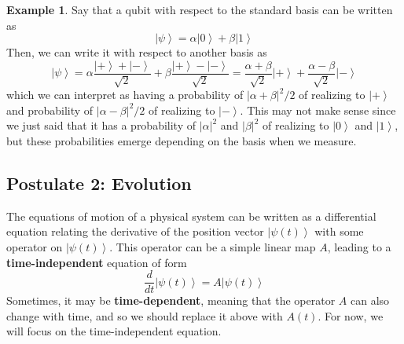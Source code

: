 \documentclass{article}
\newcommand{\ket}[1]{\ensuremath{\left|#1\right\rangle}}
\theoremstyle{definition}
\newtheorem{example}{Example}[section]
\begin{document}
    \begin{example} 
      Say that a qubit with respect to the standard basis can be written as 
      \begin{equation}
        \ket{\psi} = \alpha \ket{0} + \beta \ket{1}
        \label{eq:qubit_standard_basis}
      \end{equation}
      Then, we can write it with respect to another basis as 
      \begin{equation}
        \ket{\psi} = \alpha \frac{\ket{+} + \ket{-}}{\sqrt{2}} + \beta \frac{\ket{+} - \ket{-}}{\sqrt{2}} = \frac{\alpha + \beta}{\sqrt{2}} \ket{+} + \frac{\alpha - \beta}{\sqrt{2}} \ket{-}
        \label{eq:qubit_not_standard_basis}
      \end{equation}
      which we can interpret as having a probability of $|\alpha + \beta|^2 /2$ of realizing to $\ket{+}$ and probability of $|\alpha - \beta|^2 / 2$ of realizing to $\ket{-}$. This may not make sense since we just said that it has a probability of $|\alpha|^2$ and $|\beta|^2$ of realizing to $\ket{0}$ and $\ket{1}$, but these probabilities emerge depending on the basis when we measure.  
    \end{example}

  \subsection{Postulate 2: Evolution}

  The equations of motion of a physical system can be written as a differential equation relating the derivative of the position vector $\ket{\psi(t)}$ with some operator on $\ket{\psi(t)}$. This operator can be a simple linear map $A$, leading to a \textbf{time-independent} equation of form
    \begin{equation}
      \frac{d}{dt} \ket{\psi(t)} = A \ket{\psi(t)} 
      \label{eq:form }
    \end{equation}
    Sometimes, it may be \textbf{time-dependent}, meaning that the operator $A$ can also change with time, and so we should replace it above with $A(t)$. For now, we will focus on the time-independent equation. 
\end{document}
